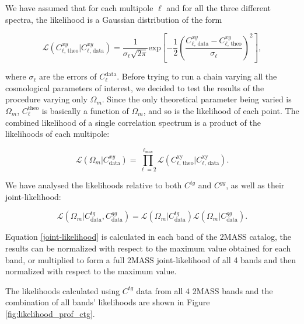 \documentclass[openany,a4paper,12pt,oneside]{book}
\begin{document}
\begin{spacing}{1.5}
We have assumed that for each multipole $\ell$ and for all the three different spectra, the likelihood is a Gaussian distribution of the form

\begin{equation}\label{likelihood_cl}
	\mathcal{L}(C_{\ell\text{, theo}}^{xy}|C_{\ell\text{, data}}^{xy})=\frac{1}{\sigma_\ell \sqrt{2\pi}}\text{exp}\left[-\frac{1}{2}\left(\frac{C_{\ell\text{, data}}^{xy}-C_{\ell\text{, theo}}^{xy}}{\sigma_\ell}\right)^2\right],
\end{equation}

\noindent where $\sigma_\ell$ are the errors of $C_\ell^\text{data}$. Before trying to run a chain varying all the cosmological parameters of interest, we decided to test the results of the procedure varying only $\Omega_m$. Since the only theoretical parameter being varied is $\Omega_m$, $C_\ell^\text{theo}$ is basically a function of $\Omega_m$, and so is the likelihood of each point. The combined likelihood of a single correlation spectrum is a product of the likelihoods of each multipole:

\begin{equation}\label{likelihood_cxy}
	\mathcal{L}(\Omega_m|C^{xy}_\text{data})=\prod_{\ell=2}^{\ell_\text{max}} \mathcal{L}(C_{\ell\text{, theo}}^\text{xy}|C_{\ell\text{, data}}^\text{xy}).
\end{equation}

We have analysed the likelihoods relative to both $C^{tg}$ and $C^{gg}$, as well as their joint-likelihood:

\begin{equation}\label{joint-likelihood}
	\mathcal{L}(\Omega_m|C^{tg}_\text{data},C^{gg}_\text{data})=\mathcal{L}(\Omega_m|C^{tg}_\text{data})\mathcal{L}(\Omega_m|C^{gg}_\text{data}).
\end{equation}

Equation \eqref{joint-likelihood} is calculated in each band of the 2MASS catalog, the results can be normalized with respect to the maximum value obtained for each band, or multiplied to form a full 2MASS joint-likelihood of all 4 bands and then normalized with respect to the maximum value. 

The likelihoods calculated using $C^{tg}$ data from all 4 2MASS bands and the combination of all bands' likelihoods are shown in Figure \ref{fig:likelihood_prof_ctg}. 


\end{spacing}
\end{document}
